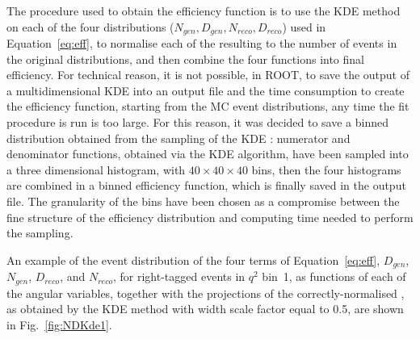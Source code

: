 The procedure used to obtain the efficiency function is to use the KDE method on each of the four distributions ($N_{gen}, D_{gen}, N_{reco}, D_{reco}$) used in Equation~\ref{eq:eff}, to normalise each of the resulting \pdfs to the number of events in the original distributions, and then combine the four functions into final efficiency.
For technical reason, it is not possible, in ROOT, to save the output of a multidimensional KDE \pdf into an output file and the time consumption to create the efficiency function, starting from the MC event distributions, any time the fit procedure is run is too large.
For this reason, it was decided to save a binned distribution obtained from the sampling of the KDE \pdfs: numerator and denominator functions, obtained via the KDE algorithm, have been sampled into a three dimensional histogram, with $40\times40\times40$ bins, then the four histograms are combined in a binned efficiency function, which is finally saved in the output file.
The granularity of the bins have been chosen as a compromise between the fine structure of the efficiency distribution and computing time needed to perform the \pdf sampling.

An example of the event distribution of the four terms of Equation~\ref{eq:eff}, $D_{gen}$, $N_{gen}$, $D_{reco}$, and $N_{reco}$, for right-tagged events in $q^2$ bin~1, as functions of each of the angular variables, together with the projections of the correctly-normalised \pdfs, as obtained by the KDE method with width scale factor equal to 0.5, are shown in Fig.~\ref{fig:NDKde1}.






